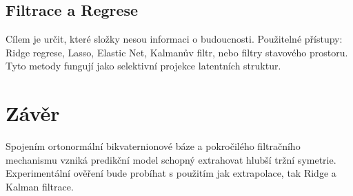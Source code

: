 \documentclass{article}
\begin{document}
\subsection{Filtrace a Regrese}

Cílem je určit, které složky nesou informaci o budoucnosti. Použitelné přístupy: Ridge regrese, Lasso, Elastic Net, Kalmanův filtr, nebo filtry stavového prostoru. Tyto metody fungují jako selektivní projekce latentních struktur.

\section{Závěr}

Spojením ortonormální bikvaternionové báze a pokročilého filtračního mechanismu vzniká predikční model schopný extrahovat hlubší tržní symetrie. Experimentální ověření bude probíhat s použitím jak extrapolace, tak Ridge a Kalman filtrace.
\end{document}
